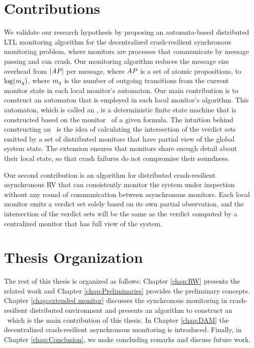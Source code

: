 \section{Contributions}

We validate our research hypothesis by proposing an automata-based distributed 
LTL monitoring algorithm for the decentralized crash-resilient synchronous 
monitoring problem, where monitors are processes that communicate by message 
passing and can crash. Our monitoring algorithm reduces the message size 
overhead from $|\mathit{AP}|$ per message, where $\mathit{AP}$ is a set of atomic propositions, 
to $\log(m_q)$, where $m_q$ is the number of outgoing 
transitions from the current monitor state in each local monitor's automaton. 
Our main contribution is to construct an automaton that is employed in each 
local monitor's algorithm. This automaton, which is called an \Exltl, is a 
deterministic finite state machine that is constructed based on the \LTLtri 
monitor~\cite{bls11} of a given \LTL formula. The intuition behind constructing 
an \Exltl~is the idea of calculating the intersection of the verdict sets 
emitted by a set of distributed monitors that have partial view of the global 
system state. The extension ensures that monitors share enough detail about 
their local state, so that crash failures do not compromise their soundness. 

Our second contribution is an algorithm for distributed crash-resilient 
asynchronous RV that can consistently monitor the system under inspection 
without any round of communication between asynchronous monitors. Each local 
monitor emits a verdict set solely based on its own partial observation, and 
the intersection of the verdict sets will be the same as the verdict computed by 
a centralized monitor that has full view of the system.



\section{Thesis Organization}

The rest of this thesis is organized as follows: Chapter \ref{chap:RW} presents 
the related work and Chapter \ref{chap:Preliminaries} provides the 
preliminary concepts. Chapter \ref{chap:extended monitor} discusses the 
synchronous monitoring in crash-resilient distributed environment and presents 
an algorithm to construct an \Exltl~which is the main contribution of this 
thesis. In Chapter \ref{chap:DAM} the decentralized crash-resilient 
asynchronous monitoring is introduced. Finally, in Chapter 
\ref{chap:Conclusion}, we make concluding remarks and discuss future work.  








